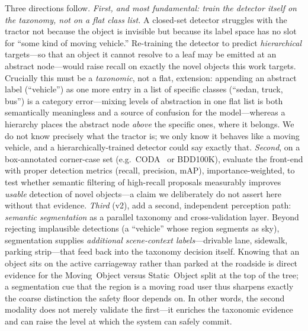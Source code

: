 \documentclass[conference]{IEEEtran}
\begin{document}
Three directions follow. \emph{First, and most fundamental: train the detector
itself on the taxonomy, not on a flat class list.} A closed-set detector
struggles with the tractor not because the object is invisible but because its
label space has no slot for ``some kind of moving vehicle.'' Re-training the
detector to predict \emph{hierarchical} targets---so that an object it cannot
resolve to a leaf may be emitted at an abstract node---would raise recall on
exactly the novel objects this work targets. Crucially this must be a
\emph{taxonomic}, not a flat, extension: appending an abstract label
(``vehicle'') as one more entry in a list of specific classes (``sedan, truck,
bus'') is a category error---mixing levels of abstraction in one flat list is
both semantically meaningless and a source of confusion for the model---whereas a
hierarchy places the abstract node \emph{above} the specific ones, where it
belongs. We do not know precisely what the tractor is; we only know it behaves
like a moving vehicle, and a hierarchically-trained detector could say exactly
that. \emph{Second}, on a box-annotated corner-case set (e.g.\ CODA~\cite{li2022}
or BDD100K), evaluate the front-end with proper detection metrics (recall,
precision, mAP), importance-weighted, to test whether semantic filtering of
high-recall proposals measurably improves \emph{usable} detection of novel
objects---a claim we deliberately do not assert here without that evidence.
\emph{Third} (v2), add a second, independent perception path: \emph{semantic
segmentation} as a parallel taxonomy and cross-validation layer. Beyond rejecting
implausible detections (a ``vehicle'' whose region segments as sky), segmentation
supplies \emph{additional scene-context labels}---drivable lane, sidewalk,
parking strip---that feed back into the taxonomy decision itself. Knowing that an
object sits on the active carriageway rather than parked at the roadside is direct
evidence for the \textsf{Moving~Object} versus \textsf{Static~Object} split at the
top of the tree; a segmentation cue that the region is a moving road user thus
sharpens exactly the coarse distinction the safety floor depends on. In other
words, the second modality does not merely validate the first---it enriches the
taxonomic evidence and can raise the level at which the system can safely commit.
\end{document}
